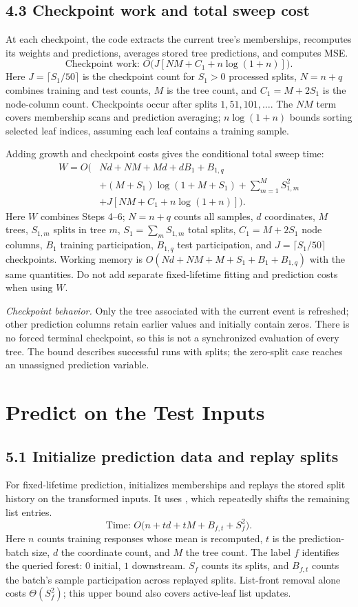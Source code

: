 \documentclass[11pt]{article}
\newcommand{\code}[1]{\texttt{\detokenize{#1}}}
\begin{document}
\subsection*{4.3 Checkpoint work and total sweep cost}
At each checkpoint, the code extracts the current tree's memberships,
recomputes its weights and predictions, averages stored tree predictions,
and computes MSE.
\[
\text{Checkpoint work: }O\bigl(J[NM+C_1+n\log(1+n)]\bigr).
\]
Here $J=\lceil S_1/50\rceil$ is the checkpoint count for $S_1>0$ processed
splits, $N=n+q$ combines training and test counts, $M$ is the tree count, and
$C_1=M+2S_1$ is the node-column count. Checkpoints occur after splits
$1,51,101,\ldots$. The $NM$ term covers membership scans and prediction
averaging; $n\log(1+n)$ bounds sorting selected leaf indices, assuming each
leaf contains a training sample.

Adding growth and checkpoint costs gives the conditional total sweep time:
\[
\boxed{\begin{aligned}
W=O\bigl(&Nd+NM+Md+dB_1+B_{1,q}\\
&+(M+S_1)\log(1+M+S_1)+\sum_{m=1}^{M}S_{1,m}^2\\
&+J[NM+C_1+n\log(1+n)]\bigr).
\end{aligned}}
\]
Here $W$ combines Steps 4--6; $N=n+q$ counts all samples, $d$ coordinates,
$M$ trees, $S_{1,m}$ splits in tree $m$, $S_1=\sum_m S_{1,m}$ total splits,
$C_1=M+2S_1$ node columns, $B_1$ training participation, $B_{1,q}$ test
participation, and $J=\lceil S_1/50\rceil$ checkpoints.
Working memory is $O(Nd+NM+M+S_1+B_1+B_{1,q})$ with the same quantities.
Do not add separate fixed-lifetime fitting and prediction costs when using $W$.

\emph{Checkpoint behavior.} Only the tree associated with the current event
is refreshed; other prediction columns retain earlier values and initially
contain zeros. There is no forced terminal checkpoint, so this is not a
synchronized evaluation of every tree. The bound describes successful runs
with splits; the zero-split case reaches an unassigned prediction variable.

\section{Predict on the Test Inputs}

\subsection*{5.1 Initialize prediction data and replay splits}
For fixed-lifetime prediction, \code{evaluate} initializes memberships and
replays the stored split history on the transformed inputs. It uses
\code{history.pop(0)}, which repeatedly shifts the remaining list entries.
\[
\text{Time: }O\bigl(n+td+tM+B_{f,t}+S_f^2\bigr).
\]
Here $n$ counts training responses whose mean is recomputed, $t$ is the
prediction-batch size, $d$ the coordinate count, and $M$ the tree count.
The label $f$ identifies the queried forest: $0$ initial, $1$ downstream.
$S_f$ counts its splits, and $B_{f,t}$ counts the batch's sample participation
across replayed splits. List-front removal alone costs $\Theta(S_f^2)$;
this upper bound also covers active-leaf list updates.
\end{document}
